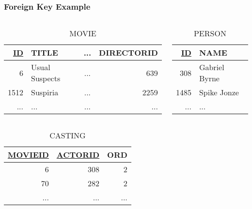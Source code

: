 \documentclass[dvipsnames]{beamer}
\theoremstyle{plain}
\begin{document}
\begin{frame}
  \frametitle{Foreign Key Example}

  \begin{example}
    \begin{columns}
      \begin{tiny}
      \begin{table}
        \caption{MOVIE}
        \begin{tabular}{|r|l|c|r|}\hline
\underline{ID} & TITLE & ... & DIRECTORID\\\hline\hline
   6 & Usual Suspects  & ... &        639\\\hline
1512 & Suspiria        & ... &       2259\\\hline
 ... & ...             & ... &        ...\\\hline
        \end{tabular}
      \end{table}
      \end{tiny}

      \begin{tiny}
      \begin{table}
        \caption{PERSON}
        \begin{tabular}{|r|l|}\hline
\underline{ID} & NAME\\\hline\hline
 308 & Gabriel Byrne \\\hline
1485 & Spike Jonze   \\\hline
 ... & ...           \\\hline
        \end{tabular}
      \end{table}
      \end{tiny}
    \end{columns}

    \begin{tiny}
    \begin{table}
      \caption{CASTING}
      \begin{tabular}{|r|r|r|}\hline
\underline{MOVIEID} & \underline{ACTORID} & ORD\\\hline\hline
  6 & 308 &   2\\\hline
 70 & 282 &   2\\\hline
... & ... & ...\\\hline
      \end{tabular}
    \end{table}
    \end{tiny}
  \end{example}


\end{frame}
\end{document}
